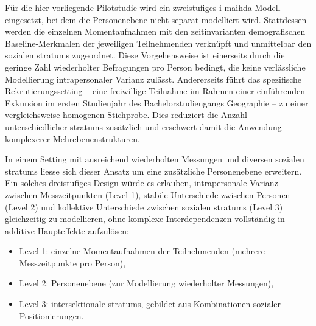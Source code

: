 Für die hier vorliegende Pilotstudie wird ein zweistufiges \gls{i-maihda}-Modell eingesetzt, bei dem die Personenebene nicht separat modelliert wird. Stattdessen werden die einzelnen Momentaufnahmen mit den zeitinvarianten demografischen Baseline-Merkmalen der jeweiligen Teilnehmenden verknüpft und unmittelbar den sozialen \glspl{stratum} zugeordnet. Diese Vorgehensweise ist einerseits durch die geringe Zahl wiederholter Befragungen pro Person bedingt, die keine verlässliche Modellierung intrapersonaler Varianz zulässt. Andererseits führt das spezifische Rekrutierungssetting -- eine freiwillige Teilnahme im Rahmen einer einführenden Exkursion im ersten Studienjahr des Bachelorstudiengangs Geographie -- zu einer vergleichsweise homogenen Stichprobe. Dies reduziert die Anzahl unterschiedlicher \glspl{stratum} zusätzlich und erschwert damit die Anwendung komplexerer Mehrebenenstrukturen.


In einem Setting mit ausreichend wiederholten Messungen und diversen sozialen \glspl{stratum} liesse sich dieser Ansatz um eine zusätzliche Personenebene erweitern. Ein solches dreistufiges Design würde es erlauben, intrapersonale Varianz zwischen Messzeitpunkten (Level 1), stabile Unterschiede zwischen Personen (Level 2) und kollektive Unterschiede zwischen sozialen \glspl{stratum} (Level 3) gleichzeitig zu modellieren, ohne komplexe Interdependenzen vollständig in additive Haupteffekte aufzulösen:

\begin{itemize}
\item Level 1: einzelne Momentaufnahmen der Teilnehmenden (mehrere Messzeitpunkte pro Person),
\item Level 2: Personenebene (zur Modellierung wiederholter Messungen),
\item Level 3: intersektionale \glspl{stratum}, gebildet aus Kombinationen sozialer Positionierungen.
\end{itemize}

\vspace{1em}

